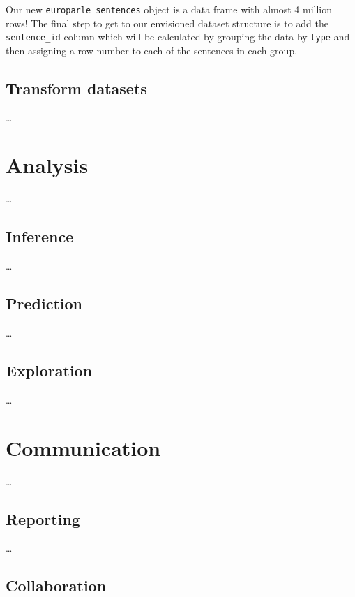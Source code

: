 \documentclass[
  letterpaper,
]{latex/krantz}
\begin{document}
Our new \texttt{europarle\_sentences} object is a data frame with almost
4 million rows! The final step to get to our envisioned dataset
structure is to add the \texttt{sentence\_id} column which will be
calculated by grouping the data by \texttt{type} and then assigning a
row number to each of the sentences in each group.

\hypertarget{transform-datasets-chapter}{%
\chapter{Transform datasets}\label{transform-datasets-chapter}}

\ldots{}

\part{Analysis}

\ldots{}

\hypertarget{inference-chapter}{%
\chapter{Inference}\label{inference-chapter}}

\ldots{}

\hypertarget{prediction-chapter}{%
\chapter{Prediction}\label{prediction-chapter}}

\ldots{}

\hypertarget{exploration-chapter}{%
\chapter{Exploration}\label{exploration-chapter}}

\ldots{}

\part{Communication}

\ldots{}

\hypertarget{reporting-chapter}{%
\chapter{Reporting}\label{reporting-chapter}}

\ldots{}

\hypertarget{collaboration-chapter}{%
\chapter{Collaboration}\label{collaboration-chapter}}
\end{document}
